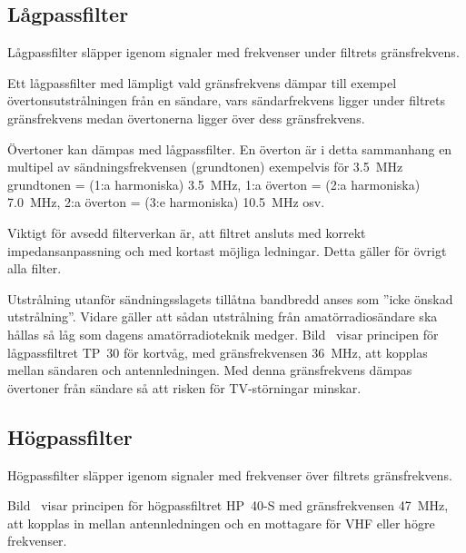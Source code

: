 \subsection{Lågpassfilter}
\label{subsec:laagpassfilter}

Lågpassfilter släpper igenom signaler med frekvenser under filtrets
gränsfrekvens.

Ett lågpassfilter med lämpligt vald gränsfrekvens dämpar till exempel
övertonsutstrålningen från en sändare, vars sändarfrekvens ligger under filtrets
gränsfrekvens medan övertonerna ligger över dess gränsfrekvens.

Övertoner kan dämpas med lågpassfilter.
En överton är i detta sammanhang en multipel av sändningsfrekvensen
(grundtonen) exempelvis för
\qty{3,5}{\mega\hertz} grundtonen = (1:a harmoniska) \qty{3,5}{\mega\hertz},
1:a överton = (2:a harmoniska) \qty{7,0}{\mega\hertz},
2:a överton = (3:e harmoniska) \qty{10,5}{\mega\hertz} osv.

Viktigt för avsedd filterverkan är, att filtret ansluts med korrekt
impedansanpassning och med kortast möjliga ledningar.
Detta gäller för övrigt alla filter.

Utstrålning utanför sändningsslagets tillåtna bandbredd anses som
''icke önskad utstrålning''.
Vidare gäller att sådan utstrålning från amatörradiosändare ska hållas så låg
som dagens amatörradioteknik medger.
Bild~ visar principen för lågpassfiltret TP~30 för kortvåg,
med gränsfrekvensen \qty{36}{\mega\hertz}, att kopplas mellan sändaren och
antennledningen.
Med denna gränsfrekvens dämpas övertoner från sändare så att risken för
TV-störningar minskar.


\subsection{Högpassfilter}
\label{subsec:hoegpassfilter}

Högpassfilter släpper igenom signaler med frekvenser över filtrets
gränsfrekvens.

Bild~ visar principen för högpassfiltret HP~40-S med
gränsfrekvensen \qty{47}{\mega\hertz}, att kopplas in mellan antennledningen och
en mottagare för VHF eller högre frekvenser.


